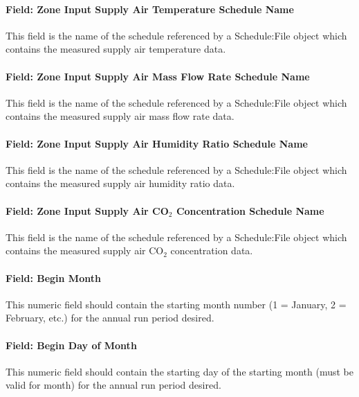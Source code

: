 \paragraph{Field: Zone Input Supply Air Temperature Schedule Name}\label{field-zone-input-supply-air-temperature-schedule-name-hm}
This field is the name of the schedule referenced by a Schedule:File object which contains the measured supply air temperature data.

\paragraph{Field: Zone Input Supply Air Mass Flow Rate Schedule Name}\label{field-zone-input-supply-air-mass-flow-rate-schedule-name-hm}
This field is the name of the schedule referenced by a Schedule:File object which contains the measured supply air mass flow rate data.

\paragraph{Field: Zone Input Supply Air Humidity Ratio Schedule Name}\label{field-zone-input-supply-air-humidity-ratio-schedule-name-hm}
This field is the name of the schedule referenced by a Schedule:File object which contains the measured supply air humidity ratio data.

\paragraph{Field: Zone Input Supply Air CO$_2$ Concentration Schedule Name}\label{field-zone-input-supply-air-co2-concentration-schedule-name-hm}
This field is the name of the schedule referenced by a Schedule:File object which contains the measured supply air CO$_2$ concentration data.

\paragraph{Field: Begin Month}\label{field-begin-month-hm}
This numeric field should contain the starting month number (1 = January, 2 = February, etc.) for the annual run period desired.

\paragraph{Field: Begin Day of Month}\label{field-begin-day-of-month-hm}
This numeric field should contain the starting day of the starting month (must be valid for month) for the annual run period desired.

